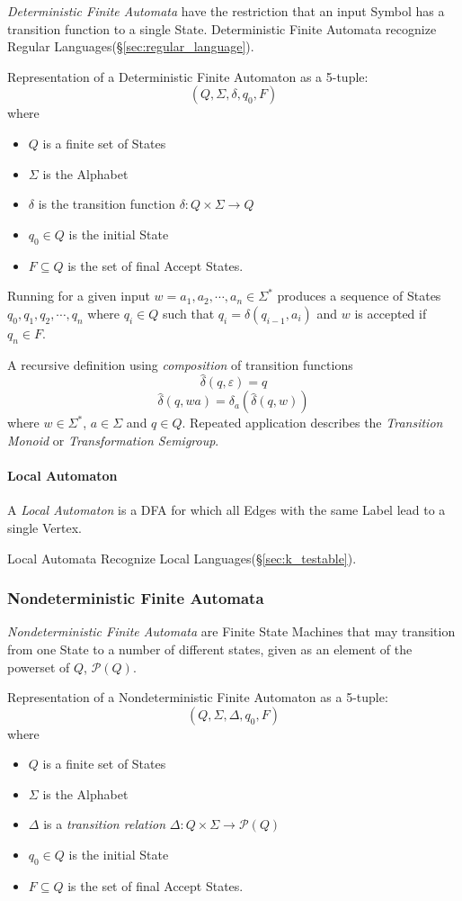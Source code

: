 \emph{Deterministic Finite Automata} have the restriction that an
input Symbol has a transition function to a single State.
Deterministic Finite Automata recognize Regular
Languages(\S\ref{sec:regular_language}).

Representation of a Deterministic Finite Automaton as a 5-tuple:
\[
    (Q,\Sigma,\delta,q_0,F)
\]
where
\begin{itemize}
\item $Q$ is a finite set of States
\item $\Sigma$ is the Alphabet
\item $\delta$ is the transition function $\delta: Q \times
  \Sigma \rightarrow Q$
\item $q_0 \in Q$ is the initial State
\item $F \subseteq Q$ is the set of final Accept States.
\end{itemize}

Running for a given input $w = a_1,a_2, \cdots , a_n \in \Sigma^*$
produces a sequence of States $q_0,q_1,q_2,\cdots , q_n$ where $q_i
\in Q$ such that $q_i = \delta (q_{i-1},a_i)$ and $w$ is accepted if
$q_n \in F$.

A recursive definition using \emph{composition} of transition
functions
\[
    \widehat{\delta}(q,\varepsilon) = q
\]\[
    \widehat{\delta}(q,wa) = \delta_a(\widehat{\delta}(q,w))
\]
where $w \in \Sigma^*$, $a \in \Sigma$ and $q \in Q$. Repeated
application describes the \emph{Transition Monoid} or
\emph{Transformation Semigroup}.

\paragraph{Local Automaton}\label{sec:local_automaton}
A \emph{Local Automaton} is a DFA for which all Edges with the same
Label lead to a single Vertex.

Local Automata Recognize Local Languages(\S\ref{sec:k_testable}).



\subsubsection{Nondeterministic Finite Automata}\label{sec:ndfa}

\emph{Nondeterministic Finite Automata} are Finite State Machines that
may transition from one State to a number of different states, given
as an element of the powerset of $Q$, $\mathcal{P}(Q)$.

Representation of a Nondeterministic Finite Automaton as a
5-tuple:
\[
    (Q,\Sigma,\Delta,q_0,F)
\]
where
\begin{itemize}
\item $Q$ is a finite set of States
\item $\Sigma$ is the Alphabet
\item $\Delta$ is a \emph{transition relation} $\Delta: Q \times
  \Sigma \rightarrow \mathcal{P}(Q)$
\item $q_0 \in Q$ is the initial State
\item $F \subseteq Q$ is the set of final Accept States.
\end{itemize}

